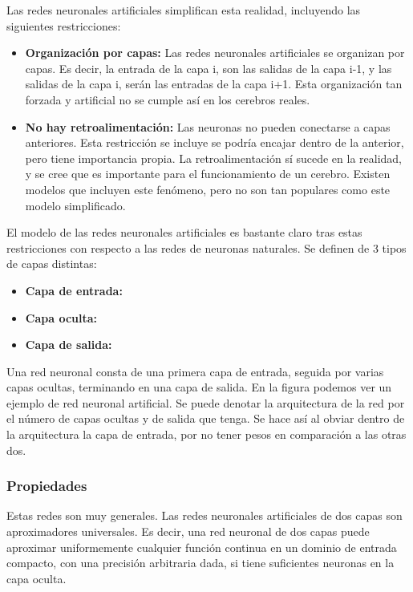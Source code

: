 Las redes neuronales artificiales simplifican esta realidad, incluyendo las siguientes restricciones:
\begin{itemize}
\item \textbf{Organización por capas:} Las redes neuronales artificiales se organizan por capas. Es decir, la entrada de la capa i, son las salidas de la capa i-1, y las salidas de la capa i, serán las entradas de la capa i+1. Esta organización tan forzada y artificial no se cumple así en los cerebros reales. 
\item \textbf{No hay retroalimentación:} Las neuronas no pueden conectarse a capas anteriores. Esta restricción se incluye se podría encajar dentro de la anterior, pero tiene importancia propia. La retroalimentación sí sucede en la realidad, y se cree que es importante para el funcionamiento de un cerebro. Existen modelos que incluyen este fenómeno, pero no son tan populares como este modelo simplificado. 
\end{itemize}

El modelo de las redes neuronales artificiales es bastante claro tras estas restricciones con respecto a las redes de neuronas naturales. Se definen de 3 tipos de capas distintas:
\begin{itemize}
\item \textbf{Capa de entrada:} 
\item \textbf{Capa oculta:}
\item \textbf{Capa de salida:}
\end{itemize}

Una red neuronal consta de una primera capa de entrada, seguida por varias capas ocultas, terminando en una capa de salida. En la figura  podemos ver un ejemplo de red neuronal artificial. Se puede denotar la arquitectura de la red por el número de capas ocultas y de salida que tenga. Se hace así al obviar dentro de la arquitectura la capa de entrada, por no tener pesos en comparación a las otras dos.\\

\subsubsection{Propiedades}

Estas redes son muy generales. Las redes neuronales artificiales de dos capas son aproximadores universales. Es decir, una red neuronal de dos capas puede aproximar uniformemente cualquier función continua en un dominio de entrada compacto, con una precisión arbitraria dada, si tiene suficientes neuronas en la capa oculta\cite{Cybenco}\cite{Hornik}.\\

